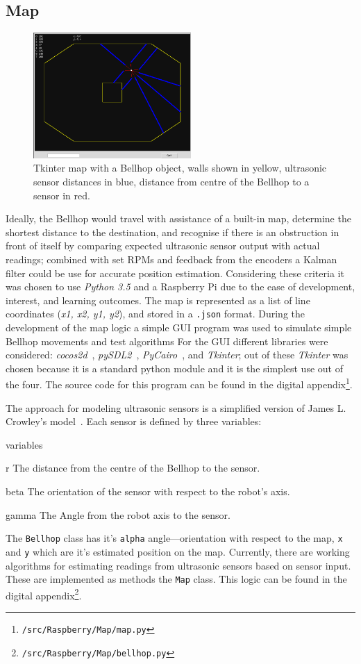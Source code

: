 \documentclass[11pt]{article}
\begin{document}
\newpage
\subsection*{Map}
\begin{figure}
  \includegraphics[width=6cm]{GUI.png}
  \caption{Tkinter map with a Bellhop object, walls shown in yellow, ultrasonic sensor distances in blue, distance from centre of the Bellhop to a sensor in red.}
  \label{GUI}
\end{figure}
Ideally, the Bellhop would travel with assistance of a built-in map, determine the shortest distance to the destination, and recognise if there is an obstruction in front of itself by comparing expected ultrasonic sensor output with actual readings; combined with set RPMs and feedback from the encoders a Kalman filter could be use for accurate position estimation. Considering these criteria it was chosen to use \textit{Python 3.5} and a Raspberry Pi due to the ease of development, interest, and learning outcomes. The map is represented as a list of line coordinates (\textit{x1, x2, y1, y2}), and stored in a \texttt{.json} format. During the development of the map logic a simple GUI program was used to simulate simple Bellhop movements and test algorithms For the GUI different libraries were considered: \textit{cocos2d}~\cite{cocos2d}, \textit{pySDL2}~\cite{PySDL2}, \textit{PyCairo}~\cite{cairo}, and \textit{Tkinter}; out of these \textit{Tkinter} was chosen because it is a standard python module and it is the simplest use out of the four. The source code for this program can be found in the digital appendix\footnote{\texttt{/src/Raspberry/Map/map.py}}.


The approach for modeling ultrasonic sensors is a simplified version of James L. Crowley's model~\cite{ultrasonicpaper}. Each sensor is defined by three variables:
\begin{labeling}{variables}
\item [r] The distance from the centre of the Bellhop to the sensor.
\item [beta] The orientation of the sensor with respect to the robot's axis.
\item [gamma] The Angle from the robot axis to the sensor.
\end{labeling}
The \texttt{Bellhop} class has it's \texttt{alpha} angle---orientation with respect to the map, \texttt{x} and \texttt{y} which are it's estimated position on the map. Currently, there are working algorithms for estimating readings from ultrasonic sensors based on sensor input. These are implemented as methods the \texttt{Map} class. This logic can be found in the digital appendix\footnote{\texttt{/src/Raspberry/Map/bellhop.py}}.
\end{document}
